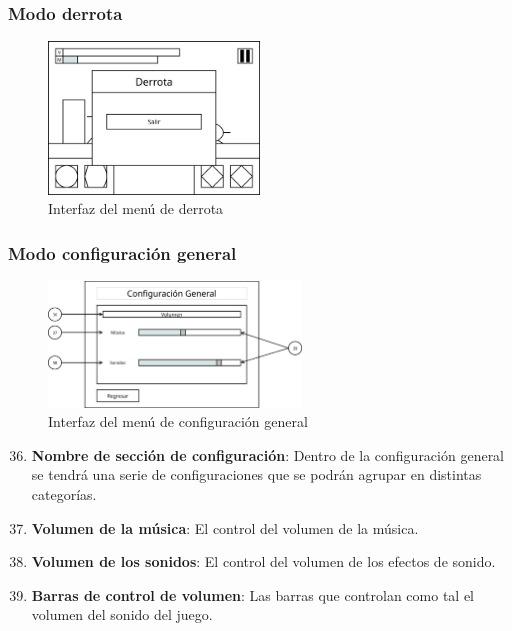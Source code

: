 \subsubsection{Modo derrota}
\begin{figure}[H]
    \centering
    \includegraphics[width=0.5\textwidth]{5-Cuerpo/Chapter5/I9.png} %
    \caption{Interfaz del menú de derrota}
    \label{fig:Interface_Derrota}
\end{figure}


\subsubsection{Modo configuración general}
\begin{figure}[H]
    \centering
    \includegraphics[width=0.6\textwidth]{5-Cuerpo/Chapter5/I10.png} %
    \caption{Interfaz del menú de configuración general}
    \label{fig:Interface_Configuracion_General}
\end{figure}
\begin{enumerate}\setcounter{enumi}{35}
    \item \textbf{Nombre de sección de configuración}: Dentro de la
    configuración general se tendrá una serie de configuraciones que se podrán
    agrupar en distintas categorías.
    \item \textbf{Volumen de la música}: El control del volumen de la música.
    \item \textbf{Volumen de los sonidos}: El control del volumen de los efectos
    de sonido.
    \item \textbf{Barras de control de volumen}: Las barras que controlan como
    tal el volumen del sonido del juego.
\end{enumerate}